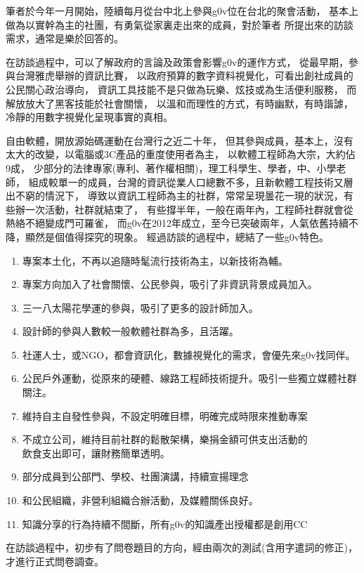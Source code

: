 筆者於今年一月開始，陸續每月從台中北上參與g0v位在台北的聚會活動，
基本上做為以實幹為主的社團，有勇氣從家裏走出來的成員，對於筆者
所提出來的訪談需求，通常是樂於回答的。

在訪談過程中，可以了解政府的言論及政策會影響g0v的運作方式，
從最早期，參與台灣雅虎舉辦的資訊比賽，
以政府預算的數字資料視覺化，可看出創社成員的公民關心政治導向，
資訊工具技能不是只做為玩樂、炫技或為生活便利服務，
而解放放大了黑客技能於社會關懷，
以溫和而理性的方式，有時幽默，有時諧謔，冷靜的用數字視覺化呈現事實的真相。

自由軟體，開放源始碼運動在台灣行之近二十年，
但其參與成員，基本上，沒有太大的改變，以電腦或3C產品的重度使用者為主，
以軟體工程師為大宗，大約佔9成，
少部分的法律專家(專利、著作權相關)，理工科學生、學者，中、小學老師，
組成較單一的成員，台灣的資訊從業人口總數不多，且新軟體工程技術又層出不窮的情況下，
導致以資訊工程師為主的社群，常常呈現曇花一現的狀況，有些辦一次活動，社群就結束了，
有些撐半年，一般在兩年內，工程師社群就會從熱絡不絕變成門可羅雀，
而g0v在2012年成立，至今已突破兩年，人氣依舊持續不降，顯然是個值得探究的現象。
經過訪談的過程中，總結了一些g0v特色。

\begin{enumerate}
\item 專案本土化，不再以追隨時髦流行技術為主，以新技術為輔。
\item 專案方向加入了社會關懷、公民參與，吸引了非資訊背景成員加入。
\item 三一八太陽花學運的參與，吸引了更多的設計師加入。
\item 設計師的參與人數較一般軟體社群為多，且活躍。
\item 社運人士，或NGO，都會資訊化，數據視覺化的需求，會優先來g0v找同伴。
\item 公民戶外運動，從原來的硬體、線路工程師技術提升。吸引一些獨立媒體社群關注。
\item 維持自主自發性參與，不設定明確目標，明確完成時限來推動專案
\item 不成立公司，維持目前社群的鬆散架構，樂捐金額可供支出活動的 \\
       飲食支出即可，讓財務簡單透明。
\item 部分成員到公部門、學校、社團演講，持續宣揚理念
\item 和公民組織，非營利組織合辦活動，及媒體關係良好。
\item 知識分享的行為持續不間斷，所有g0v的知識產出授權都是創用CC
\end{enumerate}

在訪談過程中，初步有了問卷題目的方向，經由兩次的測試(含用字遣詞的修正)，才進行正式問卷調查。





